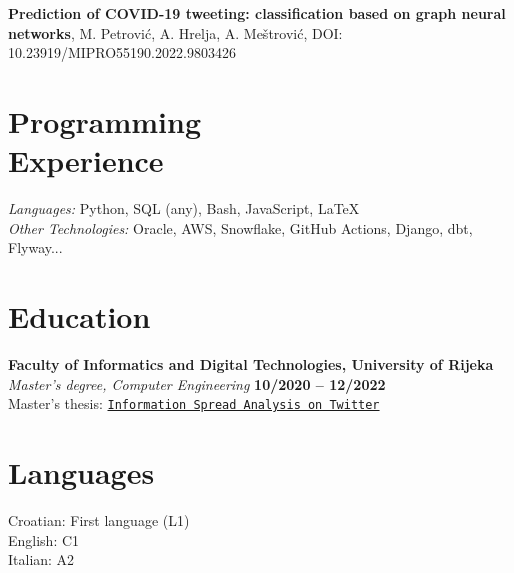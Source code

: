 \documentclass[margin,line]{resume}
\begin{document}
\begin{resume}
    \textbf{Prediction of COVID-19 tweeting: classification based on graph neural networks}, M. Petrović, A. Hrelja, A. Meštrović, DOI: 10.23919/MIPRO55190.2022.9803426


    \vspace{3mm}

    \section{\mysidestyle Programming\\Experience}

    \emph{Languages:} Python, SQL (any), Bash, JavaScript, \LaTeX \\
    \emph{Other Technologies:} Oracle, AWS, Snowflake, GitHub Actions, Django, dbt, Flyway...

    \vspace{3mm}

    \section{\mysidestyle Education}

    \textbf{Faculty of Informatics and Digital Technologies, University of Rijeka} \vspace{2mm}\\\vspace{1mm}%
    \textsl{Master's degree, Computer Engineering} \hfill \textbf{10/2020 -- 12/2022}\\
    Master's thesis: \href{{https://zir.nsk.hr/islandora/object/infri%3A999}}{{\texttt{{Information Spread Analysis on Twitter}}}}


    \vspace{3mm}
    
        \section{\mysidestyle Languages}

    Croatian: First language (L1) \\
	English: C1 \\
	Italian: A2 \\

\end{resume}
\end{document}

